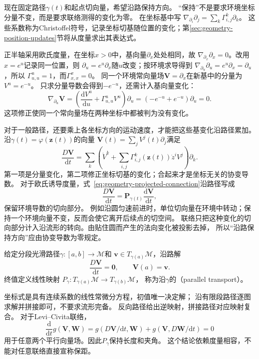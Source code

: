 现在固定路径$\gamma(t)$和起点切向量，希望沿路保持方向。
“保持”不是要求环境坐标分量不变，而是要求联络测得的变化为零。
在坐标基中写
$\nabla_{\partial_i}\partial_j=\sum_k\Gamma^k_{i,j}\partial_k$。
这些系数称为Christoffel符号，记录坐标切基随位置的变化；第\ref{sec:geometry-position-updates}节将从度量求出其表达式。

\begin{example}[坐标基变化怎样进入导数]
\label{ex:geometry-coordinate-connection}
正半轴采用欧氏度量，在坐标$x>0$中，基向量$\partial_x$处处相同，故
$\nabla_{\partial_x}\partial_x=0$。改用$x=e^u$记录同一位置，则
$\partial_u=e^u\partial_x$随$u$改变；按环境求导得到
$\nabla_{\partial_u}\partial_u=e^u\partial_x=\partial_u$，所以
$\Gamma^u_{u,u}=1$，而$\Gamma^x_{x,x}=0$。
同一个环境常向量场$\bm V=\partial_x$在新基中的分量为$V^u=e^{-u}$。
只求分量导数会得到$-e^{-u}$，还需计入基向量变化：
\[
 \nabla_{\partial_u}\bm V
 =\left(\frac{\mathrm d V^u}{\mathrm du}
               +\Gamma^u_{u,u}V^u\right)\partial_u
 =(-e^{-u}+e^{-u})\partial_u=0.
\]
这项修正使同一个常向量场在两种坐标中都被判为没有变化。
\end{example}

对于一般路径，还要乘上各坐标方向的运动速度，才能把这些基变化沿路径累加。
沿$\gamma(t)=\varphi(\bm z(t))$的向量
$\bm V(t)=\sum_jV^j(t)\partial_j$满足
\begin{equation}
 \frac{D\bm V}{\mathrm dt}
 =\sum_k\left(\dot V^k+
     \sum_{i,j}\Gamma^k_{i,j}(\bm z(t))\dot z^iV^j\right)\partial_k.
 \label{eq:geometry-covariant-derivative-along-path}
\end{equation}
第一项是分量变化，第二项修正坐标切基的变化；合起来才是坐标无关的协变导数。
对于欧氏诱导度量，式~\eqref{eq:geometry-projected-connection}沿路径写成
\[
 \frac{D\bm V}{\mathrm dt}
 =\bm P_{\gamma(t)}\frac{\mathrm d\bm V}{\mathrm dt},
\]
保留环境导数的切向部分。
例如沿圆匀速前进时，单位切向量在环境中转动；保持一个环境向量不变，反而会使它离开后续点的切空间。
联络只把这种变化的切向部分计入沿流形的转向。由贴住圆而产生的法向变化被投影去掉，
所以“沿路保持方向”应由协变导数为零规定。

\begin{definition}[平行移动]
\label{def:geometry-parallel-transport}
给定分段光滑路径$\gamma:[a,b]\to\mathcal M$和
$\bm v\in T_{\gamma(a)}\mathcal M$，沿路解
\[
 \frac{D\bm V}{\mathrm dt}=\bm0,\qquad \bm V(a)=\bm v.
\]
终值定义线性映射
$P_\gamma:T_{\gamma(a)}\mathcal M\to T_{\gamma(b)}\mathcal M$，
称为沿$\gamma$的（parallel transport）。
\end{definition}
坐标式是具有连续系数的线性常微分方程，初值唯一决定解；
沿有限段路径逐图求解并拼接即可，不要求流形完备。
反向路径给出逆映射，拼接路径对应映射复合。
对于Levi--Civita联络，
\[
 \frac{\mathrm d}{\mathrm dt}g(\bm V,\bm W)
 =g(D\bm V/\mathrm dt,\bm W)+g(\bm V,D\bm W/\mathrm dt)=0
\]
用于任意两个平行向量场。因此$P_\gamma$保持长度和夹角。
这个结论依赖度量相容，不能对任意联络直接宣称保距。

